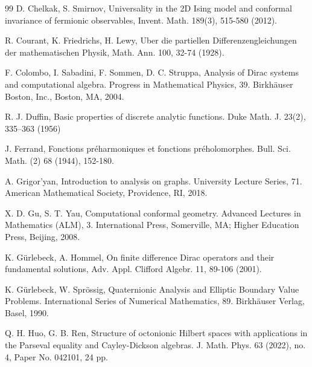 \documentclass{amsart}
\theoremstyle{definition}
\theoremstyle{remark}
\numberwithin{equation}{section}
\begin{document}
\begin{thebibliography}{99}
    D. Chelkak, S. Smirnov,
    {Universality in the 2D Ising model and conformal invariance of fermionic observables}, Invent. Math.  {189}(3), 515-580 (2012).


R. Courant, K. Friedrichs, H. Lewy,
{ Uber die partiellen Differenzengleichungen der mathematischen Physik}, Math. Ann.  {100}, 32-74 (1928).

F. Colombo,   I. Sabadini,   F. Sommen, D. C. Struppa,  Analysis of Dirac systems and computational algebra. Progress in Mathematical Physics, 39. Birkh\"{a}user Boston, Inc., Boston, MA, 2004.









R. J. Duffin,  Basic properties of discrete analytic functions. Duke Math. J. 23(2), 335–363 (1956)






J. Ferrand,  Fonctions pr\'{e}harmoniques et fonctions pr\'{e}holomorphes. Bull. Sci. Math. (2) 68 (1944), 152-180.






A. Grigor'yan,   Introduction to analysis on graphs. University Lecture Series, 71. American Mathematical Society, Providence, RI, 2018.




X. D. Gu,  S. T.  Yau,  Computational conformal geometry. Advanced Lectures in Mathematics (ALM), 3. International Press, Somerville, MA; Higher Education Press, Beijing, 2008.



K. G\"{u}rlebeck,  A. Hommel,
{ On finite difference Dirac operators and their fundamental solutions},
Adv. Appl. Clifford Algebr.  {11}, 89-106 (2001).



K. G\"{u}rlebeck,  W. Spr\"{o}ssig,   Quaternionic Analysis and Elliptic Boundary Value Problems. International Series of Numerical Mathematics, 89. Birkh\"{a}user Verlag, Basel, 1990.


Q. H. Huo, G. B.   Ren,   Structure of octonionic Hilbert spaces with applications in the Parseval equality and Cayley-Dickson algebras. J. Math. Phys. 63 (2022), no. 4, Paper No. 042101, 24 pp.








\end{thebibliography}
\end{document}
